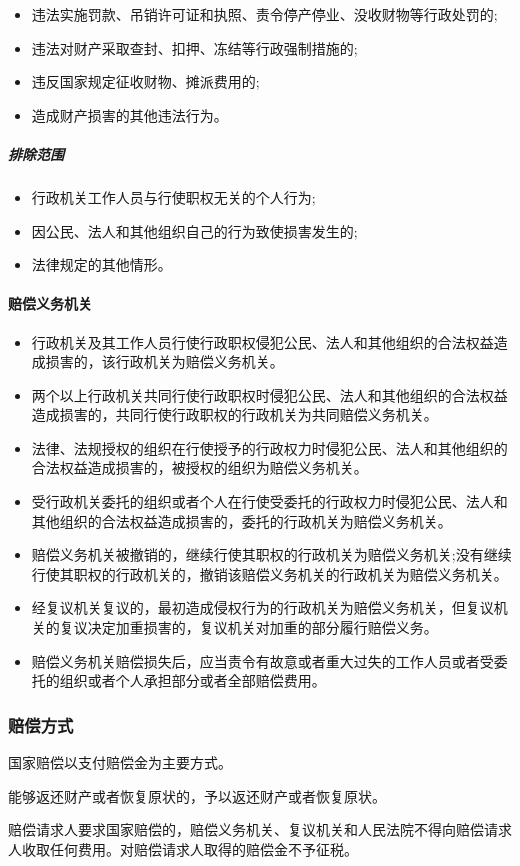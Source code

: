 \begin{itemize}
    \item 违法实施罚款、吊销许可证和执照、责令停产停业、没收财物等行政处罚的;
    \item 违法对财产采取查封、扣押、冻结等行政强制措施的;
    \item 违反国家规定征收财物、摊派费用的;
    \item 造成财产损害的其他违法行为。
\end{itemize}

\subparagraph{排除范围}

\begin{itemize}
    \item 行政机关工作人员与行使职权无关的个人行为;
    \item 因公民、法人和其他组织自己的行为致使损害发生的;
    \item 法律规定的其他情形。
\end{itemize}

\paragraph{赔偿义务机关}

\begin{itemize}
    \item 行政机关及其工作人员行使行政职权侵犯公民、法人和其他组织的合法权益造成损害的，该行政机关为赔偿义务机关。
    \item 两个以上行政机关共同行使行政职权时侵犯公民、法人和其他组织的合法权益造成损害的，共同行使行政职权的行政机关为共同赔偿义务机关。
    \item 法律、法规授权的组织在行使授予的行政权力时侵犯公民、法人和其他组织的合法权益造成损害的，被授权的组织为赔偿义务机关。
    \item 受行政机关委托的组织或者个人在行使受委托的行政权力时侵犯公民、法人和其他组织的合法权益造成损害的，委托的行政机关为赔偿义务机关。
    \item 赔偿义务机关被撤销的，继续行使其职权的行政机关为赔偿义务机关;没有继续行使其职权的行政机关的，撤销该赔偿义务机关的行政机关为赔偿义务机关。
    \item 经复议机关复议的，最初造成侵权行为的行政机关为赔偿义务机关，但复议机关的复议决定加重损害的，复议机关对加重的部分履行赔偿义务。
    \item 赔偿义务机关赔偿损失后，应当责令有故意或者重大过失的工作人员或者受委托的组织或者个人承担部分或者全部赔偿费用。
\end{itemize}

\subsubsection{赔偿方式} 国家赔偿以支付赔偿金为主要方式。

能够返还财产或者恢复原状的，予以返还财产或者恢复原状。

赔偿请求人要求国家赔偿的，赔偿义务机关、复议机关和人民法院不得向赔偿请求人收取任何费用。对赔偿请求人取得的赔偿金不予征税。



